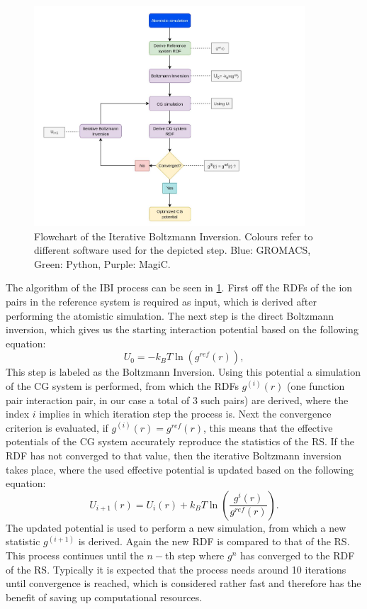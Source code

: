 \documentclass[10pt]{article}
\begin{document}
            \begin{figure}[H]
                \centering
                \includegraphics[width=0.9\textwidth]{flowchart_custom.jpg}
                \caption{Flowchart of the Iterative Boltzmann Inversion. Colours refer to different software used for the depicted step. Blue: GROMACS, Green: Python, Purple: MagiC.}
                \label{fig:ibi}
            \end{figure}
        
            The algorithm of the IBI process can be seen in \ref{fig:ibi}. First off the RDFs of the ion pairs in the reference system is required as input, which is derived after performing the atomistic simulation. The next step is the direct Boltzmann inversion, which gives us the starting interaction potential based on the following equation:
            \begin{equation}
                U_0 = -k_B T \ln(g^{ref}(r)),
            \end{equation}
            This step is labeled as the Boltzmann Inversion. Using this potential a simulation of the CG system is performed, from which the RDFs $g^{(i)}(r)$ (one function pair interaction pair, in our case a total of 3 such pairs) are derived, where the index $i$ implies in which iteration step the process is. Next the convergence criterion is evaluated, if $g^{(i)}(r) = g^{ref}(r)$, this means that the effective potentials of the CG system accurately reproduce the statistics of the RS. If the RDF has not converged to that value, then the iterative Boltzmann inversion takes place, where the used effective potential is updated based on the following equation:
            \begin{equation}
                U_{i+1}(r) = U_i(r) + k_B T \ln(\dfrac{g^i(r)}{g^{ref}(r)}).  
            \end{equation}
            The updated potential is used to perform a new simulation, from which a new statistic $g^{(i+1)}$ is derived. Again the new RDF is compared to that of the RS. This process continues until the $n-$th step where $g^{n}$ has converged to the RDF of the RS. Typically it is expected that the process needs around 10 iterations until convergence is reached, which is considered rather fast and therefore has the benefit of saving up computational resources. 
            
\end{document}
